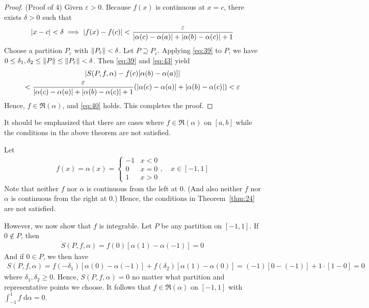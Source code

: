 \documentclass[thmcnt=section, 12pt]{my-elegantbook}
\begin{document}
\begin{proof}
    \par (Proof of 4) Given $\varepsilon > 0$. Because $f(x)$ is continuous at $x=c$, there exists $\delta > 0$ such that 
    \begin{align}
        \left\lvert x - c \right\rvert < \delta
        \implies \left\lvert f(x) - f(c) \right\rvert < \frac{\varepsilon}{\left\lvert \alpha(c) - \alpha(a) \right\rvert + \left\lvert \alpha(b) - \alpha(c) \right\rvert + 1}
        \label{eq:43}
    \end{align}
    Choose a partition $P_\varepsilon$ with $\left\lVert P_\varepsilon \right\rVert < \delta$. Let $P \supseteq P_\varepsilon$. Applying \eqref{eq:39} to $P$, we have $0 \leq \delta_1, \delta_2 \leq \left\lVert P \right\rVert \leq \left\lVert P_\varepsilon \right\rVert < \delta$. Then \eqref{eq:39} and \eqref{eq:43} yield 
    \begin{multline*}
        \left\lvert 
            S(P,f,\alpha)
            - f(c) [\alpha(b) - \alpha(a)]
         \right\rvert \\
        <   \frac{\varepsilon}{\left\lvert \alpha(c) - \alpha(a) \right\rvert + \left\lvert \alpha(b) - \alpha(c) \right\rvert + 1} (\left\lvert \alpha(c) - \alpha(a) \right\rvert
        + \left\lvert \alpha(b) - \alpha(c) \right\rvert)
        < \varepsilon
    \end{multline*}
    Hence, $f \in \mathfrak{R}(\alpha)$, and \eqref{eq:40} holds. This completes the proof.
\end{proof}

It should be emphasized that there are cases where $f \in \mathfrak{R}(\alpha)$ on $[a, b]$ while the conditions in the above theorem are not satisfied.

\begin{example}
    Let 
    \begin{align*}
        f(x) = \alpha(x) = \begin{cases}
            -1 &x < 0 \\ 
            0 &x=0 \\ 
            1 &x > 0
        \end{cases}, 
        \quad x \in [-1, 1]
    \end{align*}
    Note that neither $f$ nor $\alpha$ is continuous from the left at $0$. (And also neither $f$ nor $\alpha$ is continuous from the right at $0$.) Hence, the conditions in Theorem~\ref{thm:24} are not satisfied.
    
    However, we now show that $f$ is integrable. Let $P$ be any partition on $[-1, 1]$. If $0 \notin P$, then 
    \begin{align*}
        S(P,f,\alpha) = f(0)[\alpha(1) - \alpha(-1)] = 0
    \end{align*}
    And if $0 \in P$, we then have
    \begin{align*}
        S(P,f,\alpha) = f(-\delta_1)[\alpha(0) - \alpha(-1)] + f(\delta_2)[\alpha(1) - \alpha(0)]
        = (-1)[0-(-1)] + 1 \cdot [1 - 0]
        = 0
    \end{align*}
    where $\delta_1, \delta_2 \geq 0$. Hence, $S(P,f,\alpha) = 0$ no matter what partition and representative points we choose. It follows that $f \in \mathfrak{R}(\alpha)$ on $[-1, 1]$ with $\int_{-1}^{1} f \; \mathrm{d}\alpha = 0$.
\end{example}
\end{document}
